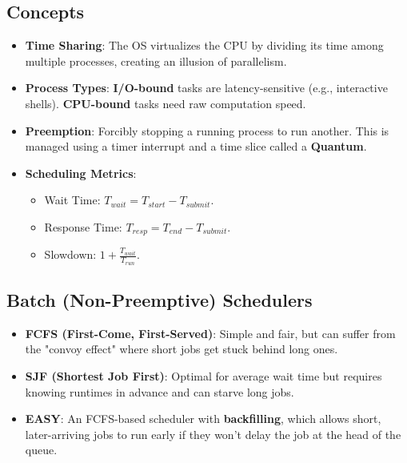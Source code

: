\documentclass[8pt,a4paper]{article}
\begin{document}
\begin{multicols}{2}
\subsection*{Concepts}
\begin{itemize}
    \item \textbf{Time Sharing}: The OS virtualizes the CPU by dividing its time among multiple processes, creating an illusion of parallelism.
    \item \textbf{Process Types}: \textbf{I/O-bound} tasks are latency-sensitive (e.g., interactive shells). \textbf{CPU-bound} tasks need raw computation speed.
    \item \textbf{Preemption}: Forcibly stopping a running process to run another. This is managed using a timer interrupt and a time slice called a \textbf{Quantum}.
    \item \textbf{Scheduling Metrics}:
    \begin{itemize}
        \item Wait Time: $T_{wait} = T_{start} - T_{submit}$.
        \item Response Time: $T_{resp} = T_{end} - T_{submit}$.
        \item Slowdown: $1 + \frac{T_{wait}}{T_{run}}$.
    \end{itemize}
\end{itemize}
\subsection*{Batch (Non-Preemptive) Schedulers}
\begin{itemize}
    \item \textbf{FCFS (First-Come, First-Served)}: Simple and fair, but can suffer from the "convoy effect" where short jobs get stuck behind long ones.
    \item \textbf{SJF (Shortest Job First)}: Optimal for average wait time but requires knowing runtimes in advance and can starve long jobs.
    \item \textbf{EASY}: An FCFS-based scheduler with \textbf{backfilling}, which allows short, later-arriving jobs to run early if they won't delay the job at the head of the queue.
\end{itemize}


\end{multicols}
\end{document}
